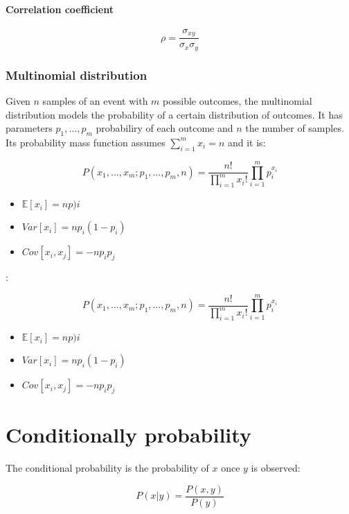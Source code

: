 			\paragraph{Correlation coefficient}

			$$\rho = \frac{\sigma_{xy}}{\sigma_x\sigma_y}$$

		\subsubsection{Multinomial distribution}
		Given $n$ samples of an event with $m$ possible outcomes, the multinomial distribution models the probability of a certain distribution of outcomes.
		It has parameters $p_1,\dots, p_m$ probabiliry of each outcome and $n$ the number of samples.
		Its probability mass function assumes $\sum\limits_{i=1}^mx_i = n$ and it is:

		$$P(x_1, \dots, x_m; p_1, \dots, p_m, n) = \dfrac{n!}{\prod\limits_{i=1}^mx_i!}\prod\limits_{i=1}^mp_i^{x_i}$$

		\begin{multicols}{3}
			\begin{itemize}
				\item $\mathbb{E}[x_i] = np)i$
				\item $Var[x_i] = np_i(1-p_i)$
				\item $Cov[x_i, x_j] = -np_ip_j$
			\end{itemize}
		\end{multicols}:

		$$P(x_1, \dots, x_m; p_1, \dots, p_m, n) = \dfrac{n!}{\prod\limits_{i=1}^mx_i!}\prod\limits_{i=1}^mp_i^{x_i}$$

		\begin{multicols}{3}
			\begin{itemize}
				\item $\mathbb{E}[x_i] = np)i$
				\item $Var[x_i] = np_i(1-p_i)$
				\item $Cov[x_i, x_j] = -np_ip_j$
			\end{itemize}
		\end{multicols}

\section{Conditionally probability}
The conditional probability is the probability of $x$ once $y$ is observed:

$$P(x|y) = \dfrac{P(x,y)}{P(y)}$$

